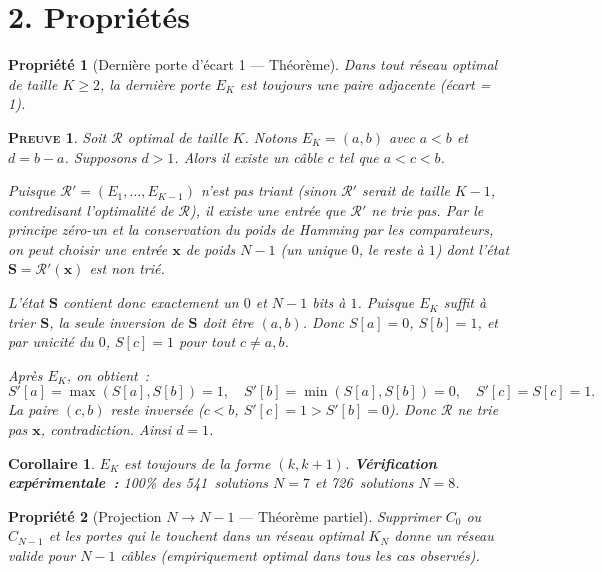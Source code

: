 \documentclass[11pt,a4paper]{article}
\theoremstyle{propretheoreme}
\newtheorem{propriete}{Propriété}
\theoremstyle{proprepreuve}
\newtheorem*{preuve}{\small\textsc{Preuve}}
\theoremstyle{proprecorollaire}
\newtheorem*{corollaire}{Corollaire}
\begin{document}
\section*{2. Propriétés}

\begin{propriete}[Dernière porte d'écart 1 --- Théorème]\label{p1}
Dans tout réseau optimal de taille $K \ge 2$, la dernière porte $E_K$ est toujours une paire adjacente (écart = 1).
\end{propriete}

\begin{preuve}
Soit $\mathcal{R}$ optimal de taille $K$. Notons $E_K = (a,b)$ avec $a<b$ et $d = b-a$. Supposons $d > 1$. Alors il existe un câble $c$ tel que $a<c<b$.

Puisque $\mathcal{R}' = (E_1,\ldots,E_{K-1})$ n'est pas triant (sinon $\mathcal{R}'$ serait de taille $K-1$, contredisant l'optimalité de $\mathcal{R}$), il existe une entrée que $\mathcal{R}'$ ne trie pas. Par le principe zéro-un et la conservation du poids de Hamming par les comparateurs, on peut choisir une entrée $\mathbf{x}$ de poids $N-1$ (un unique $0$, le reste à $1$) dont l'état $\mathbf{S} = \mathcal{R}'(\mathbf{x})$ est non trié.

L'état $\mathbf{S}$ contient donc exactement un $0$ et $N-1$ bits à $1$. Puisque $E_K$ suffit à trier $\mathbf{S}$, la seule inversion de $\mathbf{S}$ doit être $(a,b)$. Donc $S[a]=0$, $S[b]=1$, et par unicité du $0$, $S[c]=1$ pour tout $c\neq a,b$.

Après $E_K$, on obtient~:
\[
S'[a] = \max(S[a],S[b]) = 1,\quad
S'[b] = \min(S[a],S[b]) = 0,\quad
S'[c] = S[c] = 1.
\]
La paire $(c,b)$ reste inversée ($c<b$, $S'[c]=1 > S'[b]=0$). Donc $\mathcal{R}$ ne trie pas $\mathbf{x}$, contradiction. Ainsi $d=1$.
\end{preuve}

\begin{corollaire}
$E_K$ est toujours de la forme $(k,k+1)$. \textbf{Vérification expérimentale~:} 100\% des 541~solutions $N=7$ et 726~solutions $N=8$.
\end{corollaire}

\begin{propriete}[Projection $N\to N-1$ --- Théorème partiel]\label{p2}
Supprimer $C_0$ ou $C_{N-1}$ et les portes qui le touchent dans un réseau optimal $K_N$ donne un réseau valide pour $N-1$ câbles (empiriquement optimal dans tous les cas observés).
\end{propriete}
\end{document}
